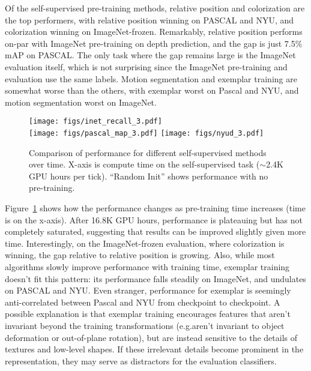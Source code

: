 \documentclass[10pt,twocolumn,letterpaper]{article}
\begin{document}
Of the self-supervised pre-training
methods, relative position and colorization are
the top performers, with relative position winning on PASCAL and NYU,
and colorization winning on ImageNet-frozen. Remarkably,
relative position performs on-par with ImageNet pre-training on depth
prediction, and the gap is just 7.5\% mAP on PASCAL.  The only task
where the gap remains large is the ImageNet evaluation itself,
which is not surprising since the ImageNet pre-training and evaluation use
the same labels.
Motion segmentation and exemplar training
are somewhat worse than the others, with exemplar worst on Pascal and NYU, and motion
segmentation worst on ImageNet.

\begin{figure}[t]
\begin{center}

   \texttt{[image: figs/inet\_recall\_3.pdf]}\\
   \texttt{[image: figs/pascal\_map\_3.pdf]}
   \texttt{[image: figs/nyud\_3.pdf]}
   
\end{center}
   \caption{
   Comparison of performance for different self-supervised methods over time.  X-axis is compute time on the self-supervised task ($\sim$2.4K GPU hours per tick).  ``Random Init'' shows performance with no pre-training.
   }
   
\label{fig:base_net_comparison}
\end{figure}


Figure~\ref{fig:base_net_comparison} shows 
how the performance changes as pre-training
time increases (time is on the x-axis).  After 16.8K GPU hours,
performance is plateauing but has not completely saturated, suggesting that
results can be improved slightly given more time.  Interestingly, on
the ImageNet-frozen evaluation, where colorization is winning, the gap
relative to relative position is growing.  Also,
while most algorithms slowly improve performance with training time,
exemplar training doesn't fit this pattern: its performance falls
steadily on ImageNet, and undulates on PASCAL and NYU.  Even
stranger, performance for exemplar is seemingly anti-correlated between Pascal and
NYU from checkpoint to checkpoint.  A possible explanation is that
exemplar training encourages features that aren't invariant beyond the 
training transformations (e.g.\they aren't invariant to object
deformation or out-of-plane rotation), but are instead sensitive to the
details of textures and low-level shapes.  If
these irrelevant details become prominent in the representation,
they may serve as distractors for the evaluation classifiers.
\end{document}
